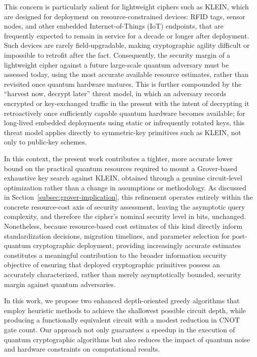 This concern is particularly salient for lightweight ciphers such as KLEIN,
which are designed for deployment on resource-constrained devices: RFID
tags, sensor nodes, and other embedded Internet-of-Things (IoT) endpoints,
that are frequently expected to remain in service for a decade or longer after
deployment. Such devices are rarely field-upgradable, making cryptographic
agility difficult or impossible to retrofit after the fact. Consequently, the
security margin of a lightweight cipher against a future large-scale quantum
adversary must be assessed today, using the most accurate available
resource estimates, rather than revisited once quantum hardware matures. This
is further compounded by the ``harvest now, decrypt later'' threat model, in
which an adversary records encrypted or key-exchanged traffic in the present
with the intent of decrypting it retroactively once sufficiently capable
quantum hardware becomes available; for long-lived embedded deployments using
static or infrequently rotated keys, this threat model applies directly to
symmetric-key primitives such as KLEIN, not only to public-key schemes.

In this context, the present work contributes a tighter, more accurate lower
bound on the practical quantum resources required to mount a Grover-based
exhaustive key search against KLEIN, obtained through a genuine circuit-level
optimization rather than a change in assumptions or methodology. As discussed
in Section~\ref{subsec:grover-implication}, this refinement operates entirely
within the concrete resource-cost axis of security assessment, leaving the
asymptotic query complexity, and therefore the cipher's nominal security
level in bits, unchanged. Nonetheless, because resource-based cost estimates
of this kind directly inform standardization decisions, migration timelines,
and parameter selection for post-quantum cryptographic deployment, providing
increasingly accurate estimates constitutes a meaningful contribution to the
broader information security objective of ensuring that deployed
cryptographic primitives possess an accurately characterized, rather than
merely asymptotically bounded, security margin against quantum adversaries.

In this work, we propose two enhanced depth-oriented greedy algorithms that
employ heuristic methods to achieve the shallowest possible circuit depth,
while producing a functionally equivalent circuit with a modest reduction in
CNOT gate count. Our approach not only guarantees a speedup in the execution
of quantum cryptographic algorithms but also reduces the impact of quantum
noise and hardware constraints on computational results.

